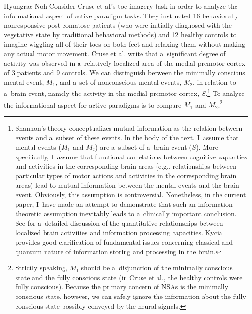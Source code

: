 \begin{artengenv}{Hyungrae Noh}
Consider Cruse et al.'s
\parencite*[][]{cruse_bedside_2011} %
 toe-imagery task in order to analyze the informational aspect of active paradigm tasks. They instructed 16 behaviorally nonresponsive post-comatose patients (who were initially diagnosed with the vegetative state by traditional behavioral methods) and 12 healthy controls to imagine wiggling all of their toes on both feet and relaxing them without making any actual motor movement. Cruse et al. write that a~significant degree of activity was observed in a~relatively localized area of the medial premotor cortex of 3 patients and 9 controls. We can distinguish between the minimally conscious mental event, $M_1$, and a~set of nonconscious mental events, $M_2$, in relation to a~brain event, namely the activity in the medial premotor cortex, $S$.\footnote{Shannon's theory conceptualizes mutual information as the relation between events and a~subset of these events. In the body of the text, I~assume that mental events ($M_1$ and $M_2$) are a~subset of a~brain event ($S$). More specifically, I~assume that functional correlations between cognitive capacities and activities in the corresponding brain areas (e.g., relationships between particular types of motor actions and activities in the corresponding brain areas) lead to mutual information between the mental events and the brain event. Obviously, this assumption is controversial. Nonetheless, in the current paper, I~have made an attempt to demonstrate that such an information-theoretic assumption inevitably leads to a~clinically important conclusion. See 
\parencite[][]{li_brain_2022} %
 for a~detailed discussion of the quantitative relationships between localized brain activities and information processing capacities. Kycia 
\parencite*[][]{kycia_information_2021} %
 provides good clarification of fundamental issues concerning classical and quantum nature of information storing and processing in the brain.} To analyze the informational aspect for active paradigms is to compare $M_1$ and $M_2$.\footnote{Strictly speaking, $M_1$ should be a~disjunction of the minimally conscious state and the fully conscious state (in Cruse et al., the healthy controls were fully conscious). Because the primary concern of NSAs is the minimally conscious state, however, we can safely ignore the information about the fully conscious state possibly conveyed by the neural signals.}


\end{artengenv}
